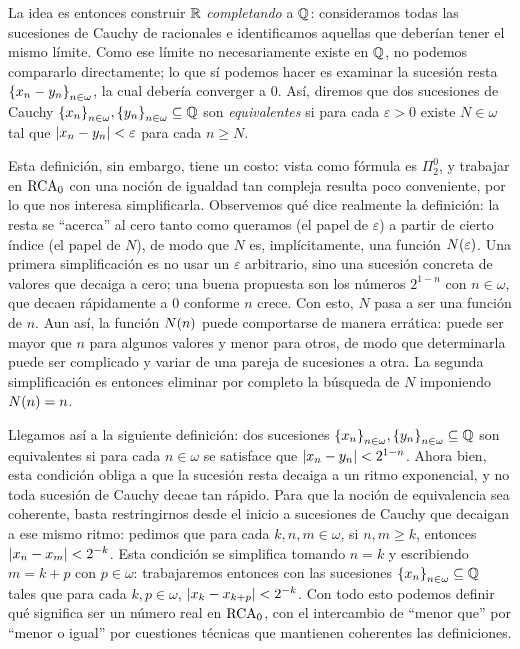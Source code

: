 La idea es entonces construir $\RR$ \emph{completando} a $\QQ$: consideramos todas las sucesiones de Cauchy de racionales e identificamos aquellas que deberían tener el mismo límite. Como ese límite no necesariamente existe en $\QQ$, no podemos compararlo directamente; lo que sí podemos hacer es examinar la sucesión resta $\set*{x_{n} - y_{n}}_{n\in\omega}$, la cual debería converger a $0$. Así, diremos que dos sucesiones de Cauchy $\set*{x_{n}}_{n\in\omega},\set*{y_{n}}_{n\in\omega}\subseteq\QQ$ son \emph{equivalentes} si para cada $\varepsilon > 0$ existe $N\in\omega$ tal que $\abs*{x_{n} - y_{n}} <\varepsilon$ para cada $n\geq N$.

Esta definición, sin embargo, tiene un costo: vista como fórmula es $\Pi_{2}^{0}$, y trabajar en $\RCA$ con una noción de igualdad tan compleja resulta poco conveniente, por lo que nos interesa simplificarla. Observemos qué dice realmente la definición: la resta se ``acerca'' al cero tanto como queramos (el papel de $\varepsilon$) a partir de cierto índice (el papel de $N$), de modo que $N$ es, implícitamente, una función $N\pa*{\varepsilon}$. Una primera simplificación es no usar un $\varepsilon$ arbitrario, sino una sucesión concreta de valores que decaiga a cero; una buena propuesta son los números $2^{1 - n}$ con $n\in\omega$, que decaen rápidamente a $0$ conforme $n$ crece. Con esto, $N$ pasa a ser una función de $n$. Aun así, la función $N\pa*{n}$ puede comportarse de manera errática: puede ser mayor que $n$ para algunos valores y menor para otros, de modo que determinarla puede ser complicado y variar de una pareja de sucesiones a otra. La segunda simplificación es entonces eliminar por completo la búsqueda de $N$ imponiendo $N\pa*{n} = n$.

Llegamos así a la siguiente definición: dos sucesiones $\set*{x_{n}}_{n\in\omega},\set*{y_{n}}_{n\in\omega}\subseteq\QQ$ son equivalentes si para cada $n\in\omega$ se satisface que $\abs*{x_{n} - y_{n}} < 2^{1 - n}$. Ahora bien, esta condición obliga a que la sucesión resta decaiga a un ritmo exponencial, y no toda sucesión de Cauchy decae tan rápido. Para que la noción de equivalencia sea coherente, basta restringirnos desde el inicio a sucesiones de Cauchy que decaigan a ese mismo ritmo: pedimos que para cada $k, n, m\in\omega$, si $n, m\geq k$, entonces $\abs*{x_{n} - x_{m}} < 2^{-k}$. Esta condición se simplifica tomando $n = k$ y escribiendo $m = k + p$ con $p\in\omega$: trabajaremos entonces con las sucesiones $\set*{x_{n}}_{n\in\omega}\subseteq\QQ$ tales que para cada $k, p\in\omega$, $\abs*{x_{k} - x_{k + p}} < 2^{-k}$. Con todo esto podemos definir qué significa ser un número real en $\RCA$, con el intercambio de ``menor que'' por ``menor o igual'' por cuestiones técnicas que mantienen coherentes las definiciones.

